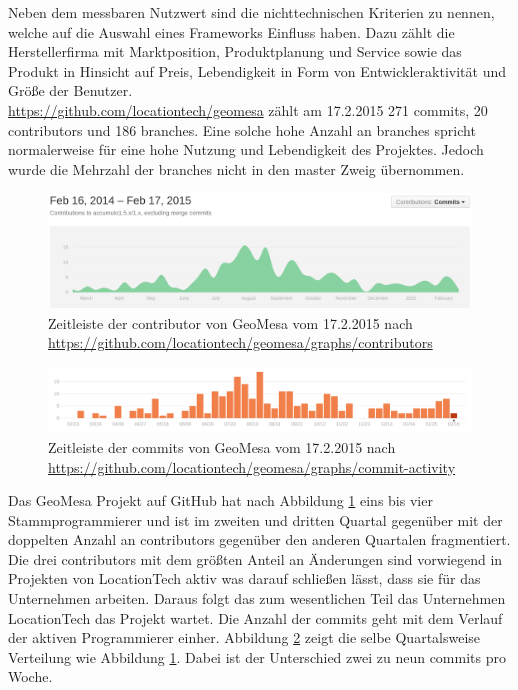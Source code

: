 Neben dem messbaren Nutzwert sind die nichttechnischen Kriterien zu nennen, welche auf die Auswahl eines Frameworks Einfluss haben.
Dazu zählt die Herstellerfirma mit Marktposition, Produktplanung und Service sowie das Produkt in Hinsicht auf Preis, Lebendigkeit in Form von Entwickleraktivität und Größe der Benutzer.\\
\url{https://github.com/locationtech/geomesa} zählt am 17.2.2015 271 commits, 20 contributors und 186 branches.
Eine solche hohe Anzahl an branches spricht normalerweise für eine hohe Nutzung und Lebendigkeit des Projektes.
Jedoch wurde die Mehrzahl der branches nicht in den master Zweig übernommen.
\begin{figure}[h!]
\centering
\includegraphics[width=\textwidth]{Abbildungen/geomesa_timeline_contributors.png}
\caption[Zeitleiste der contributor von GeoMesa]{Zeitleiste der contributor von GeoMesa vom 17.2.2015 nach \url{https://github.com/locationtech/geomesa/graphs/contributors}}
\label{fig:timeline_contr_geomesa}
\end{figure}
\begin{figure}[h!]
\centering
\includegraphics[width=\textwidth]{Abbildungen/geomesa_timeline_commits.png}
\caption[Zeitleiste der commits von GeoMesa]{Zeitleiste der commits von GeoMesa vom 17.2.2015 nach \url{https://github.com/locationtech/geomesa/graphs/commit-activity}}
\label{fig:timeline_commits_geomesa}
\end{figure}
Das GeoMesa Projekt auf GitHub hat nach Abbildung \ref{fig:timeline_contr_geomesa} eins bis vier Stammprogrammierer und ist im zweiten und dritten Quartal gegenüber mit der doppelten Anzahl an contributors gegenüber den anderen Quartalen fragmentiert.
Die drei contributors mit dem größten Anteil an Änderungen sind vorwiegend in Projekten von LocationTech aktiv was darauf schließen lässt, dass sie für das Unternehmen arbeiten.
Daraus folgt das zum wesentlichen Teil das Unternehmen LocationTech das Projekt wartet.
Die Anzahl der commits geht mit dem Verlauf der aktiven Programmierer einher.
Abbildung \ref{fig:timeline_commits_geomesa} zeigt die selbe Quartalsweise Verteilung wie Abbildung \ref{fig:timeline_contr_geomesa}.
Dabei ist der Unterschied zwei zu neun commits pro Woche.

